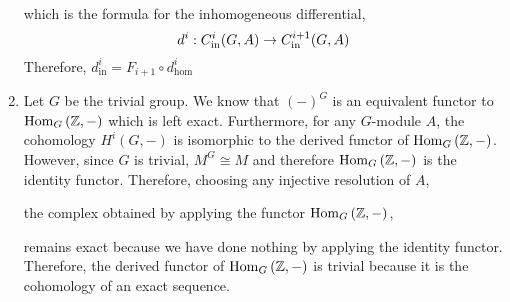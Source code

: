 \documentclass[12pt]{extarticle}
\begin{document}
\begin{enumerate}
\begin{align*}
\end{align*}
which is the formula for the inhomogeneous differential,
\[d^i : C_{\mathrm{in}}^{i}(G,A) \to C_{\mathrm{in}}^{i+1}(G,A)\] Therefore, $d^{i}_{\mathrm{in}} = F_{i+1} \circ d^i_{\mathrm{hom}}$
\item Let $G$ be the trivial group. We know that $(-)^G$ is an equivalent functor to $\mathrm{Hom}_{G}\left(\mathbb{Z}, -\right)$ which is left exact. Furthermore, for any $G$-module $A$, the cohomology $H^i(G, -)$ is isomorphic to the derived functor of $\mathrm{Hom}_{G}\left(\mathbb{Z}, -\right)$. However, since $G$ is trivial, $M^G \cong M$ and therefore $\mathrm{Hom}_{G}\left(\mathbb{Z}, -\right)$ is the identity functor. Therefore, choosing any injective resolution of $A$, 
\begin{center}
\end{center} 
the complex obtained by applying the functor $\mathrm{Hom}_{G}\left(\mathbb{Z}, -\right)$,
\begin{center}
\end{center}
remains exact because we have done nothing by applying the identity functor. Therefore, the derived functor of $\mathrm{Hom}_{G}\left(\mathbb{Z}, -\right)$ is trivial because it is the cohomology of an exact sequence.  
\end{enumerate}
\end{document}
